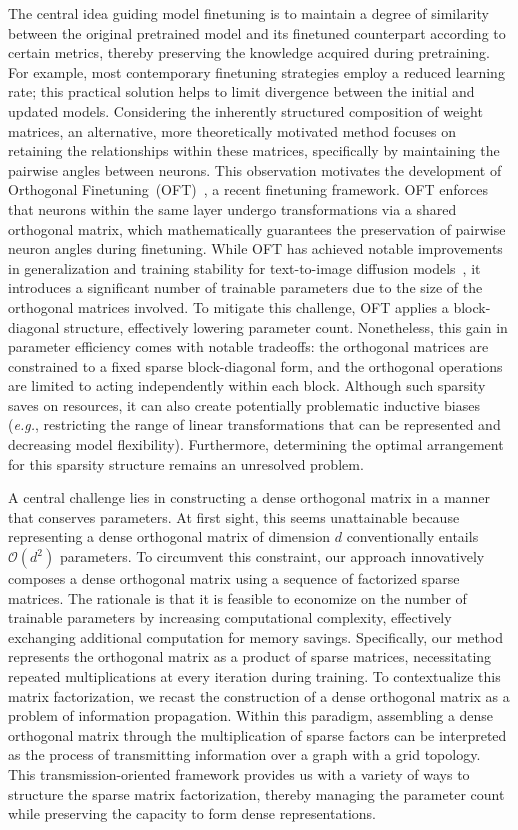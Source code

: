 The central idea guiding model finetuning is to maintain a degree of similarity between the original pretrained model and its finetuned counterpart according to certain metrics, thereby preserving the knowledge acquired during pretraining. For example, most contemporary finetuning strategies employ a reduced learning rate; this practical solution helps to limit divergence between the initial and updated models. Considering the inherently structured composition of weight matrices, an alternative, more theoretically motivated method focuses on retaining the relationships within these matrices, specifically by maintaining the pairwise angles between neurons. This observation motivates the development of Orthogonal Finetuning~(OFT)~\cite{qiu2023controlling}, a recent finetuning framework. OFT enforces that neurons within the same layer undergo transformations via a shared orthogonal matrix, which mathematically guarantees the preservation of pairwise neuron angles during finetuning. While OFT has achieved notable improvements in generalization and training stability for text-to-image diffusion models~\cite{qiu2023controlling}, it introduces a significant number of trainable parameters due to the size of the orthogonal matrices involved. To mitigate this challenge, OFT applies a block-diagonal structure, effectively lowering parameter count. Nonetheless, this gain in parameter efficiency comes with notable tradeoffs: the orthogonal matrices are constrained to a fixed sparse block-diagonal form, and the orthogonal operations are limited to acting independently within each block. Although such sparsity saves on resources, it can also create potentially problematic inductive biases (\emph{e.g.}, restricting the range of linear transformations that can be represented and decreasing model flexibility). Furthermore, determining the optimal arrangement for this sparsity structure remains an unresolved problem.

A central challenge lies in constructing a dense orthogonal matrix in a manner that conserves parameters. At first sight, this seems unattainable because representing a dense orthogonal matrix of dimension $d$ conventionally entails $\mathcal{O}(d^2)$ parameters. To circumvent this constraint, our approach innovatively composes a dense orthogonal matrix using a sequence of factorized sparse matrices. The rationale is that it is feasible to economize on the number of trainable parameters by increasing computational complexity, effectively exchanging additional computation for memory savings. Specifically, our method represents the orthogonal matrix as a product of sparse matrices, necessitating repeated multiplications at every iteration during training. To contextualize this matrix factorization, we recast the construction of a dense orthogonal matrix as a problem of information propagation. Within this paradigm, assembling a dense orthogonal matrix through the multiplication of sparse factors can be interpreted as the process of transmitting information over a graph with a grid topology. This transmission-oriented framework provides us with a variety of ways to structure the sparse matrix factorization, thereby managing the parameter count while preserving the capacity to form dense representations.

